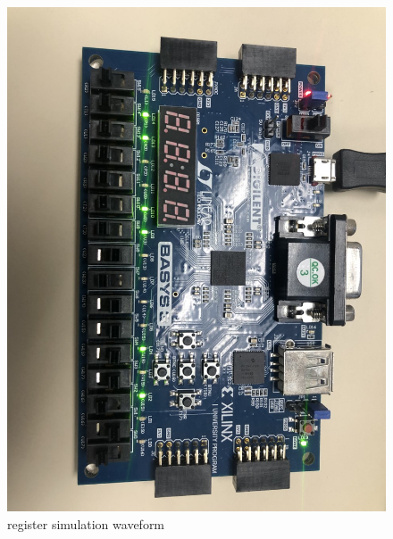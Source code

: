 \documentclass[11pt]{article}
\begin{document}
\begin{figure}[ht]\centering
	\includegraphics[width= \textwidth ]{bb4.png}
	\caption{register simulation waveform}
	\label{fig: bb4}
\end{figure}
\end{document}
